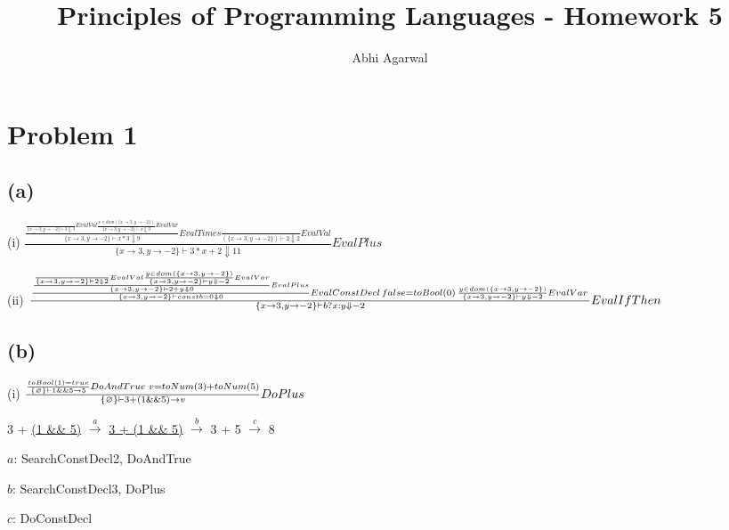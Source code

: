 \documentclass[11pt, oneside]{article}
\title{Principles of Programming Languages - Homework 5}
\author{Abhi Agarwal}
\date{}
\let\emptyset\varnothing
\newcommand{\forceindent}{\leavevmode{\parindent=1.5em\indent}}
\begin{document}
\maketitle
\section{Problem 1}
\subsection*{(a)}
\forceindent \par (i) 
$
\frac{
	\frac{
		\frac{
		}
		{
			\{x \rightarrow 3, y \rightarrow -2\} \vdash 3 \Downarrow 3
		} EvalVal
		\frac{
			x \in dom(\{x \rightarrow 3, y \rightarrow -2\})
		}
		{
			\{x \rightarrow 3, y \rightarrow -2\} \vdash x \Downarrow 3
		} EvalVar
	}
	{
		\{x \rightarrow 3, y \rightarrow -2\} \vdash x * 3 \Downarrow 9
	} EvalTimes
	\frac{
	}{
		(\{x \rightarrow 3, y \rightarrow -2\}) \vdash 2 \Downarrow 2
	} EvalVal
	{
	}
}{
	\{x \rightarrow 3, y \rightarrow -2\} \vdash 3 * x + 2 \Downarrow 11
} EvalPlus
$

\par (ii)
$
\frac{
	\frac{
		\frac {
			\frac {
			}
			{
				\{x \rightarrow 3, y \rightarrow -2\} \vdash 2 \Downarrow 2
			} EvalVal
			\frac {
				y \in dom(\{x \rightarrow 3, y \rightarrow -2\})
			}
			{
				\{x \rightarrow 3, y \rightarrow -2\} \vdash y \Downarrow -2
			} EvalVar
		}
		{
			\{x \rightarrow 3, y \rightarrow -2\} \vdash 2 + y \Downarrow 0
		} EvalPlus
	}
	{
		\{x \rightarrow 3, y \rightarrow -2\} \vdash const b = 0 \Downarrow 0
	} EvalConstDecl \thinspace
	false = toBool(0) \thinspace
	\frac{
		y \in dom(\{x \rightarrow 3, y \rightarrow -2\})
	}
	{
		\{x \rightarrow 3, y \rightarrow -2\} \vdash y \Downarrow -2
	} EvalVar \thinspace
}{
	\{x \rightarrow 3, y \rightarrow -2\} \vdash b ? x : y \Downarrow -2
} EvalIfThen
$

\subsection*{(b)}
\forceindent \par (i)
$
\frac{
	\frac{
		toBool(1) = true
	}
	{
		\{\emptyset\} \vdash 1 \&\& 5 \rightarrow 5
	} DoAndTrue \thinspace \thinspace
	v = toNum(3) + toNum(5)
}{
	\{\emptyset\} \vdash 3 + (1 \&\& 5) \rightarrow v
} DoPlus
$

\vspace{1.5\baselineskip}

\par 3 + \underline{(1 \&\& 5)} $\xrightarrow{a}$ \underline{3 + (1 \&\& 5)} $\xrightarrow{b}$ 3 + 5 $\xrightarrow{c}$ 8
\par $a$: SearchConstDecl2, DoAndTrue
\par $b$: SearchConstDecl3, DoPlus
\par $c$: DoConstDecl
\end{document}

